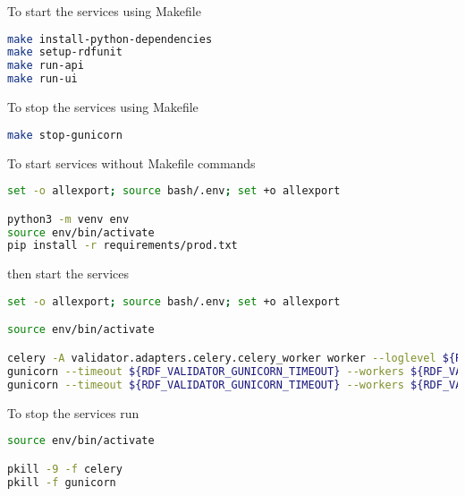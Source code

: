 To start the services using Makefile

\begin{lstlisting}[language=bash,]
make install-python-dependencies
make setup-rdfunit
make run-api
make run-ui
\end{lstlisting}

To stop the services using Makefile

\begin{lstlisting}[language=bash,]
make stop-gunicorn
\end{lstlisting}

To start services without Makefile commands

\begin{lstlisting}[language=bash,]
set -o allexport; source bash/.env; set +o allexport

python3 -m venv env
source env/bin/activate
pip install -r requirements/prod.txt
\end{lstlisting}

then start the services

\begin{lstlisting}[language=bash,]
set -o allexport; source bash/.env; set +o allexport

source env/bin/activate

celery -A validator.adapters.celery.celery_worker worker --loglevel ${RDF_VALIDATOR_LOG_LEVEL} --logfile ${RDF_VALIDATOR_CELERY_LOGS} --detach
gunicorn --timeout ${RDF_VALIDATOR_GUNICORN_TIMEOUT} --workers ${RDF_VALIDATOR_GUNICORN_API_WORKERS} --bind 0.0.0.0:${RDF_VALIDATOR_API_PORT} --reload validator.entrypoints.api.run:app --log-file ${RDF_VALIDATOR_API_LOGS} --log-level ${RDF_VALIDATOR_LOG_LEVEL} --daemon
gunicorn --timeout ${RDF_VALIDATOR_GUNICORN_TIMEOUT} --workers ${RDF_VALIDATOR_GUNICORN_UI_WORKERS} --bind 0.0.0.0:${RDF_VALIDATOR_UI_PORT} --reload validator.entrypoints.ui.run:app --log-file ${RDF_VALIDATOR_UI_LOGS} --log-level ${RDF_VALIDATOR_LOG_LEVEL} --daemon
\end{lstlisting}

To stop the services run

\begin{lstlisting}[language=bash,]
source env/bin/activate

pkill -9 -f celery
pkill -f gunicorn
\end{lstlisting}